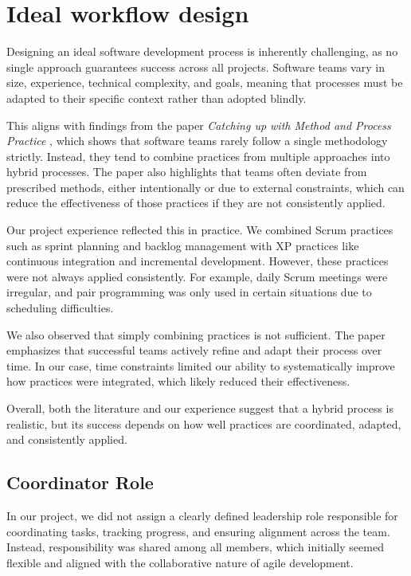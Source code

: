 \section{Ideal workflow design}

Designing an ideal software development process is inherently challenging,
as no single approach guarantees success across all projects.
Software teams vary in size, experience, technical complexity, and goals,
meaning that processes must be adapted to their specific context rather than adopted blindly.

This aligns with findings from the paper \textit{Catching up with Method and Process Practice} \cite{CatchingUpWithMethods},
which shows that software teams rarely follow a single methodology strictly.
Instead, they tend to combine practices from multiple approaches into hybrid processes.
The paper also highlights that teams often deviate from prescribed methods,
either intentionally or due to external constraints,
which can reduce the effectiveness of those practices if they are not consistently applied.

Our project experience reflected this in practice.
We combined Scrum practices such as sprint planning and backlog management
with XP practices like continuous integration and incremental development.
However, these practices were not always applied consistently.
For example, daily Scrum meetings were irregular,
and pair programming was only used in certain situations due to scheduling difficulties.

We also observed that simply combining practices is not sufficient.
The paper emphasizes that successful teams actively refine and adapt their process over time.
In our case, time constraints limited our ability to systematically improve how practices were integrated,
which likely reduced their effectiveness.

Overall, both the literature and our experience suggest that
a hybrid process is realistic, but its success depends on
how well practices are coordinated, adapted, and consistently applied.


\subsection{Coordinator Role}

In our project, we did not assign a clearly defined leadership role responsible for
coordinating tasks, tracking progress, and ensuring alignment across the team.
Instead, responsibility was shared among all members, which initially seemed flexible
and aligned with the collaborative nature of agile development.

